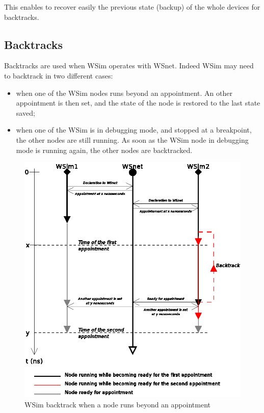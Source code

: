 \documentclass[a4paper,10pt]{report}
\begin{document}
This enables to recover easily the previous state (backup) of the whole devices for backtracks.

\subsection{Backtracks}
Backtracks are used when WSim operates with WSnet. Indeed WSim may need to backtrack in two different cases:
\begin{itemize}
  \item when one of the WSim nodes runs beyond an appointment. An other appointment is then set, and the state of the node is restored to the last state saved;
  \item when one of the WSim is in debugging mode, and stopped at a breakpoint, the other nodes are still running. As soon as the WSim node in debugging mode is running again, the other nodes are backtracked.

\end{itemize}
\begin{figure}
\begin{center}
  \includegraphics[scale=1]{figures/wsim_backtrack1.eps}
\end{center}
\caption{WSim backtrack when a node runs beyond an appointment}
\label{wsim backtrack 1}
\end{figure}
\end{document}

